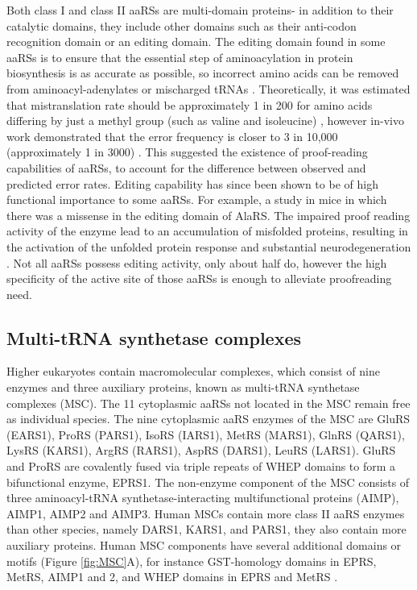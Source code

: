 Both class I and class II aaRSs are multi-domain proteins- in addition to their catalytic domains, they include other domains such as their anti-codon recognition domain or an editing domain.
The editing domain found in some aaRSs is to ensure that the essential step of aminoacylation in protein biosynthesis is as accurate as possible, so incorrect amino acids can be removed from aminoacyl-adenylates or mischarged tRNAs \cite{kwon2019aminoacyl}.
Theoretically, it was estimated that mistranslation rate should be approximately 1 in 200 for amino acids differing by just a methyl group (such as valine and isoleucine) \cite{pauling1958festschrift}, however in-vivo work demonstrated that the error frequency is closer to 3 in 10,000 (approximately 1 in 3000) \cite{loftfield1972frequency}.
This suggested the existence of proof-reading capabilities of aaRSs, to account for the difference between observed and predicted error rates.
Editing capability has since been shown to be of high functional importance to some aaRSs.
For example, a study in mice in which there was a missense in the editing domain of AlaRS.
The impaired proof reading activity of the enzyme lead to an accumulation of misfolded proteins, resulting in the activation of the unfolded protein response and substantial neurodegeneration \cite{lee2006editing}.
Not all aaRSs possess editing activity, only about half do, however the high specificity of the active site of those aaRSs is enough to alleviate proofreading need.

\subsection{Multi-tRNA synthetase complexes}
Higher eukaryotes contain macromolecular complexes, which consist of nine enzymes and three auxiliary proteins, known as multi-tRNA synthetase complexes (MSC).
The 11 cytoplasmic aaRSs not located in the MSC remain free as individual species.
The nine cytoplasmic aaRS enzymes of the MSC are GluRS (EARS1), ProRS (PARS1), IsoRS (IARS1), MetRS (MARS1), GlnRS (QARS1), LysRS (KARS1), ArgRS (RARS1), AspRS (DARS1), LeuRS (LARS1).
GluRS and ProRS are covalently fused via triple repeats of WHEP domains to form a bifunctional enzyme, EPRS1.
The non-enzyme component of the MSC consists of three aminoacyl-tRNA synthetase-interacting multifunctional proteins (AIMP), AIMP1, AIMP2 and AIMP3.
Human MSCs contain more class II aaRS enzymes than other species, namely DARS1, KARS1, and PARS1, they also contain more auxiliary proteins.
Human MSC components have several additional domains or motifs (Figure \ref{fig:MSC}A), for instance GST-homology domains in EPRS, MetRS, AIMP1 and 2, and WHEP domains in EPRS and MetRS \cite{kim2019evolution, khan20203, kim2020structures}.

